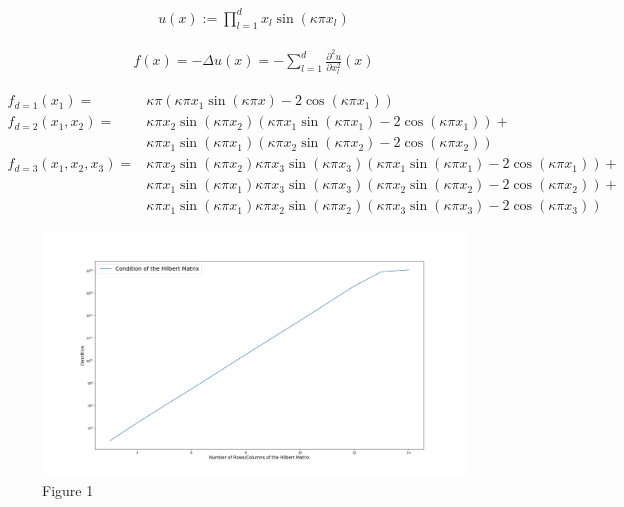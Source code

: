 \documentclass[refman]{article}
\theoremstyle{definition}
\begin{document}
\begin{align*}
	u(x) := \prod_{l=1}^d x_l \sin (\kappa \pi x_l)
\end{align*}

\begin{align*}
	f(x) = - \Delta u(x) = -\sum_{l = 1}^d \frac{\partial^2 u}{\partial x_l^2} (x)
\end{align*}

\begin{align*}
	f_{d=1} (x_1) =& \kappa \pi \left( \kappa \pi x_1 \sin ( \kappa \pi x ) - 2 \cos( \kappa \pi x_1) \right) \\
%	
	f_{d=2} (x_1, x_2) =& \kappa \pi x_2 \sin( \kappa \pi x_2) \left(  \kappa \pi x_1 \sin(\kappa \pi x_1) - 2 \cos ( \kappa \pi x_1) \right) + \\ 
	& \kappa \pi x_1 \sin( \kappa \pi x_1) \left(  \kappa \pi x_2 \sin(\kappa \pi x_2) - 2 \cos ( \kappa \pi x_2) \right) \\
%
	f_{d=3} (x_1, x_2, x_3) =& \kappa \pi x_2 \sin( \kappa \pi x_2) \kappa \pi x_3 \sin(\kappa \pi x_3)  \left(  \kappa \pi x_1 \sin(\kappa \pi x_1) - 2 \cos ( \kappa \pi x_1) \right) + \\
	& \kappa \pi x_1 \sin( \kappa \pi x_1) \kappa \pi x_3 \sin(\kappa \pi x_3)  \left(  \kappa \pi x_2 \sin(\kappa \pi x_2) - 2 \cos ( \kappa \pi x_2) \right) + \\
	& \kappa \pi x_1 \sin( \kappa \pi x_1) \kappa \pi x_2 \sin(\kappa \pi x_2)  \left(  \kappa \pi x_3 \sin(\kappa \pi x_3) - 2 \cos ( \kappa \pi x_3) \right)
\end{align*}

\begin{figure}[h]
	\includegraphics[width=\linewidth]{graphics/hilbert_condition.png}
	\caption{Figure 1}
	\label{fig:boat1}
\end{figure}
\end{document}
